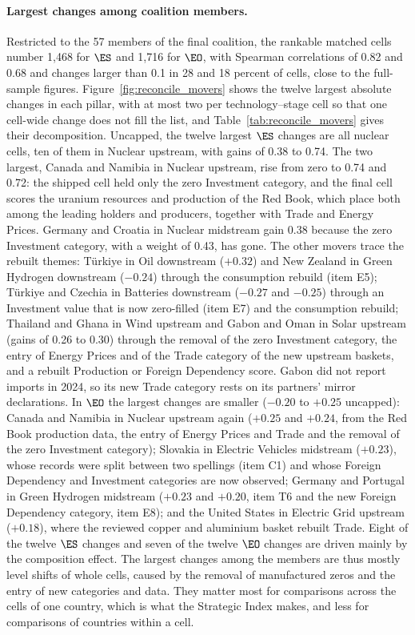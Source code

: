 \paragraph{Largest changes among coalition members.} Restricted to the 57 members of the final
coalition, the rankable matched cells number 1{,}468 for $\ES$ and 1{,}716 for $\EO$, with
Spearman correlations of 0.82 and 0.68 and changes larger than 0.1 in 28 and 18 percent of cells,
close to the full-sample figures. Figure~\ref{fig:reconcile_movers} shows the twelve largest
absolute changes in each pillar, with at most two per technology--stage cell so that one
cell-wide change does not fill the list, and Table~\ref{tab:reconcile_movers} gives their
decomposition. Uncapped, the twelve largest $\ES$ changes are all nuclear cells, ten of them in
Nuclear upstream, with gains of 0.38 to 0.74. The two largest, Canada and Namibia in Nuclear
upstream, rise from zero to 0.74 and 0.72: the shipped cell held only the zero Investment
category, and the final cell scores the uranium resources and production of the Red Book, which
place both among the leading holders and producers, together with Trade and Energy Prices.
Germany and Croatia in Nuclear midstream gain 0.38 because the zero Investment category, with a
weight of 0.43, has gone. The other movers trace the rebuilt themes: Türkiye in Oil downstream
($+0.32$) and New Zealand in Green Hydrogen downstream ($-0.24$) through the consumption rebuild
(item E5); Türkiye and Czechia in Batteries downstream ($-0.27$ and $-0.25$) through an
Investment value that is now zero-filled (item E7) and the consumption rebuild; Thailand and
Ghana in Wind upstream and Gabon and Oman in Solar upstream (gains of 0.26 to 0.30) through the
removal of the zero Investment category, the entry of Energy Prices and of the Trade category of
the new upstream baskets, and a rebuilt Production or Foreign Dependency score. Gabon did not
report imports in 2024, so its new Trade category rests on its partners' mirror declarations. In
$\EO$ the largest changes are smaller ($-0.20$ to $+0.25$ uncapped): Canada and Namibia in
Nuclear upstream again ($+0.25$ and $+0.24$, from the Red Book production data, the entry of
Energy Prices and Trade and the removal of the zero Investment category); Slovakia in Electric
Vehicles midstream ($+0.23$), whose records were split between two spellings (item C1) and whose
Foreign Dependency and Investment categories are now observed; Germany and Portugal in Green
Hydrogen midstream ($+0.23$ and $+0.20$, item T6 and the new Foreign Dependency category, item
E8); and the United States in Electric Grid upstream ($+0.18$), where the reviewed copper and
aluminium basket rebuilt Trade. Eight of the twelve $\ES$ changes and seven of the twelve $\EO$
changes are driven mainly by the composition effect. The largest changes among the members are
thus mostly level shifts of whole cells, caused by the removal of manufactured zeros and the
entry of new categories and data. They matter most for comparisons across the cells of one
country, which is what the Strategic Index makes, and less for comparisons of countries within a
cell.

